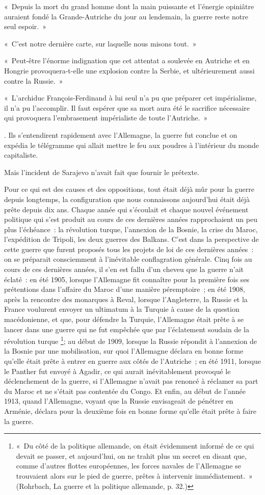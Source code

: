 \documentclass[french,twoside]{book} %
\begin{document}
{ « Depuis la mort du grand homme dont la main puissante et l’énergie opiniâtre auraient fondé la Grande-Autriche du jour au lendemain, la guerre reste notre seul espoir. »\par
 « C'est notre dernière carte, sur laquelle nous misons tout. »\par
 « Peut-être l’énorme indignation que cet attentat a soulevée en Autriche et en Hongrie provoquera-t-elle une explosion contre la Serbie, et ultérieurement aussi contre la Russie. »\par
 « L'archiduc François-Ferdinand à lui seul n’a pu que préparer cet impérialisme, il n’a pu l’accomplir. Il faut espérer que sa mort aura été le sacrifice nécessaire qui provoquera l’embrasement impérialiste de toute l’Autriche. »
}. Ils s’entendirent rapidement avec l’Allemagne, la guerre fut conclue et on expédia le télégramme qui allait mettre le feu aux poudres à l’intérieur du monde capitaliste.\par
Mais l’incident de Sarajevo n’avait fait que fournir le prétexte.\par
Pour ce qui est des causes et des oppositions, tout était déjà mûr pour la guerre depuis longtemps, la configuration que nous connaissons aujourd’hui était déjà prête depuis dix ans. Chaque année qui s’écoulait et chaque nouvel événement politique qui s’est produit au cours de ces dernières années rapprochaient un peu plus l’échéance : la révolution turque, l’annexion de la Bosnie, la crise du Maroc, l’expédition de Tripoli, les deux guerres des Balkans. C'est dans la perspective de cette guerre que furent proposés tous les projets de loi de ces dernières années : on se préparait consciemment à l’inévitable conflagration générale. Cinq fois au cours de ces dernières années, il s’en est fallu d’un cheveu que la guerre n’ait éclaté : en été 1905, lorsque l’Allemagne fit connaître pour la première fois ses prétentions dans l’affaire du Maroc d’une manière péremptoire ; en été 1908, après la rencontre des monarques à Reval, lorsque l’Angleterre, la Russie et la France voulurent envoyer un ultimatum à la Turquie à cause de la question macédonienne, et que, pour défendre la Turquie, l’Allemagne était prête à se lancer dans une guerre qui ne fut empêchée que par l’éclatement soudain de la révolution turque \footnote{« Du côté de la politique allemande, on était évidemment informé de ce qui devait se passer, et aujourd’hui, on ne trahit plus un secret en disant que, comme d’autres flottes européennes, les forces navales de l’Allemagne se trouvaient alors sur le pied de guerre, prêtes à intervenir immédiatement. » (Rohrbach, La guerre et la politique allemande, p. 32.)}; au début de 1909, lorsque la Russie répondit à l’annexion de la Bosnie par une mobilisation, sur quoi l’Allemagne déclara en bonne forme qu’elle était prête à entrer en guerre aux côtés de l’Autriche ; en été 1911, lorsque le Panther fut envoyé à Agadir, ce qui aurait inévitablement provoqué le déclenchement de la guerre, si l’Allemagne n’avait pas renoncé à réclamer sa part du Maroc et ne s’était pas contentée du Congo. Et enfin, au début de l’année 1913, quand l’Allemagne, voyant que la Russie envisageait de pénétrer en Arménie, déclara pour la deuxième fois en bonne forme qu’elle était prête à faire la guerre.\par
\end{document}
